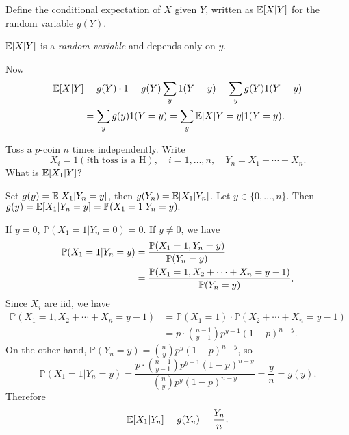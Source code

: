 \begin{definition}
    Define the conditional expectation of $X$ given $Y$, written as $ {\mathbb{E}}[X|Y] $ for the random variable $g(Y)$.
\end{definition}
\begin{remark}
    $ {\mathbb{E}}[X|Y] $ is a \textit{random variable} and depends only on $y$.
\end{remark}
Now 
\begin{align*}
    {\mathbb{E}}[X|Y] &= g(Y)\cdot 1 = g(Y) \sum_{y} 1(Y=y) = \sum_{y} g(Y)1(Y=y)\\ 
    &= \sum_{y} g(y)1(Y=y)=\sum_{y} {\mathbb{E}}[X|Y=y]1(Y=y).
\end{align*}
\begin{example}
    Toss a $p$-coin $n$ times independently. Write 
    \[
        X_i = 1(i\text{th toss is a H}),\quad i=1,\dots,n,\quad Y_n=X_1+\cdots+X_n.
    \]
    What is $ {\mathbb{E}}[X_1|Y] $?

    Set $ g(y)={\mathbb{E}}[X_1|Y_n=y] $, then $g(Y_n)={\mathbb{E}}[X_1|Y_n]$. Let $ y\in \{0,\dots,n\} $. Then $g(y) = {\mathbb{E}}[X_1|Y_n=y] = \mathbb{P}(X_1=1|Y_n=y).$ 

    If $ y=0 $, $\mathbb{P}(X_1=1|Y_n=0)=0$. If $ y\neq 0 $, we have 
    \begin{align*}
        \mathbb{P}(X_1=1|Y_n=y) &= \frac{{\mathbb{P}}(X_1=1,Y_n=y)}{{\mathbb{P}}(Y_n=y)}\\ 
        &= \frac{{\mathbb{P}}(X_1=1,X_2+\cdots+X_n=y-1)}{{\mathbb{P}}(Y_n=y)}.
    \end{align*}
    Since $X_i$ are iid, we have 
    \begin{align*}
        \mathbb{P}(X_1=1,X_2+\cdots+X_n=y-1)&= \mathbb{P}(X_1=1)\cdot \mathbb{P}(X_2+\cdots+X_n=y-1)\\ 
        &= p \cdot \binom{n-1}{y-1}p^{y-1}(1-p)^{n-y}.
    \end{align*}
    On the other hand, $ \mathbb{P}(Y_n=y) = \binom{n}{y}p^{y}(1-p)^{n-y} $, so 
    \[
        \mathbb{P}(X_1=1|Y_n=y) = \frac{p \cdot \binom{n-1}{y-1}p^{y-1}(1-p)^{n-y}}{\binom{n}{y}p^{y}(1-p)^{n-y}} = \frac{y}{n} = g(y).
    \]
    Therefore 
    \[
        {\mathbb{E}}[X_1|Y_n] = g(Y_n) = \frac{Y_n}{n}.
    \]
\end{example}

